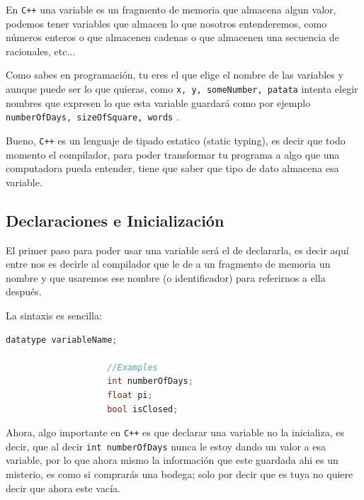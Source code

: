 \documentclass[12pt, fleqn]{report}                             %
\theoremstyle{break}                                            %
\newcommand{\textCode}[1]  { \texttt{#1} }                      %
\newcommand \Cpp  {\textCode{C++} }                               %
\begin{document}
            En \Cpp una variable es un fragmento de memoria que almacena algun valor, 
            podemos tener variables que almacen lo que nosotros entenderemos, como números enteros
            o que almacenen cadenas o que almacenen una secuencia de racionales, etc...

            Como sabes en programación, tu eres el que elige el nombre de las variables y aunque puede
            ser lo que quieras, como \textCode{x, y, someNumber, patata} intenta elegir nombres que expresen
            lo que esta variable guardará como por ejemplo \textCode{numberOfDays, sizeOfSquare, words}. 

            Bueno, \Cpp es un lenguaje de tipado estatico (static typing), es decir que todo momento el compilador,
            para poder transformar tu programa a algo que una computadora pueda entender, tiene
            que saber que tipo de dato almacena esa variable.

            \subsection{Declaraciones e Inicialización}

                El primer paso para poder usar una variable será el de declararla, es decir
                aquí entre nos es decirle al compilador que le de a un fragmento de memoria 
                un nombre y que usaremos ese nombre (o identificador) para referirnos a ella después.

                La sintaxis es sencilla:
                \begin{lstlisting}[language=C++, gobble=20]
                    datatype variableName;

                    //Examples
                    int numberOfDays;
                    float pi;
                    bool isClosed;
                \end{lstlisting}

                Ahora, algo importante en \Cpp es que declarar una variable no la inicializa, 
                es decir, que al decir \textCode{int numberOfDays} nunca le estoy dando un valor a
                esa variable, por lo que ahora mismo la información que este guardada ahi es un misterio,
                es como si comprarás una bodega; solo por decir que es tuya no quiere decir que ahora este
                vacía.
\end{document}
